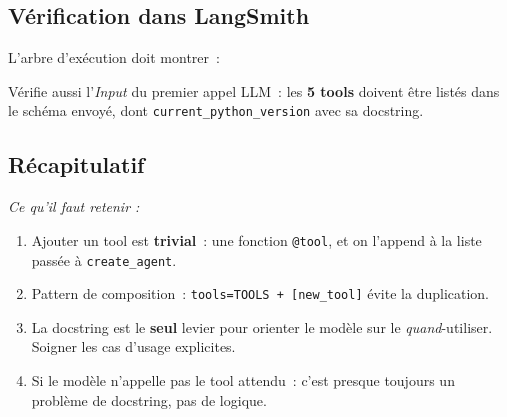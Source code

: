 \documentclass[11pt,a4paper]{article}
\begin{document}
\subsection{Vérification dans LangSmith}

L'arbre d'exécution doit montrer~:

\begin{center}
\end{center}

Vérifie aussi l'\emph{Input} du premier appel LLM~: les \textbf{5 tools}
doivent être listés dans le schéma envoyé, dont \texttt{current\_python\_version}
avec sa docstring.

\subsection*{Récapitulatif}
{\itshape\sloppy
\textit{Ce qu'il faut retenir :}
\begin{enumerate}[leftmargin=*]
  \item Ajouter un tool est \textbf{trivial}~: une fonction
        \texttt{@tool}, et on l'append à la liste passée à
        \texttt{create\_agent}.
  \item Pattern de composition~: \texttt{tools=TOOLS + [new\_tool]} évite
        la duplication.
  \item La docstring est le \textbf{seul} levier pour orienter le modèle
        sur le \emph{quand}-utiliser. Soigner les cas d'usage explicites.
  \item Si le modèle n'appelle pas le tool attendu~: c'est presque
        toujours un problème de docstring, pas de logique.
\end{enumerate}
\par}

\end{document}
